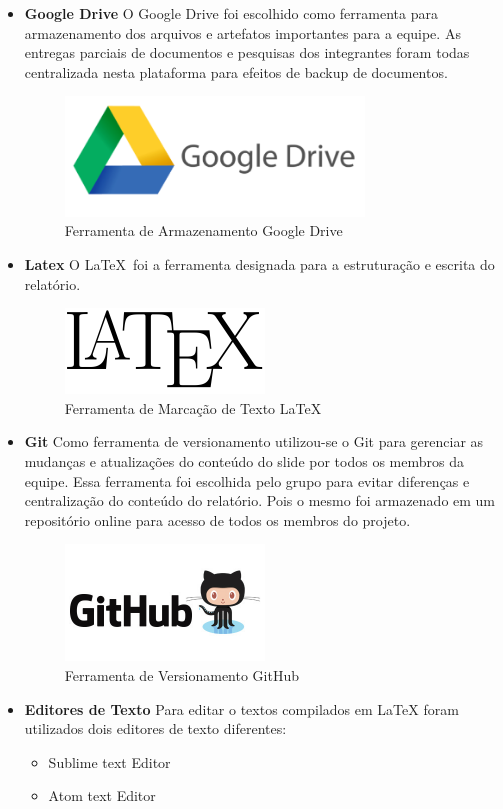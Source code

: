 \begin{itemize}
\item \textbf{Google Drive}
O Google Drive foi escolhido como ferramenta para armazenamento dos arquivos e artefatos importantes para a
equipe. As entregas parciais de documentos e pesquisas dos integrantes foram todas centralizada nesta plataforma
para efeitos de backup de documentos.
\begin{figure}[h]
  \centering
  \includegraphics[width=300px, scale=0.5]{figuras/google_drive-logo}
  \caption{Ferramenta de Armazenamento Google Drive}
  \label{table:google_drive-logo}
\end{figure}
\item \textbf{Latex}
O \LaTeX\ foi a ferramenta designada para a estruturação e escrita do relatório.
\begin{figure}[h]
  \centering
  \includegraphics[width=200px, scale=0.5]{figuras/latex_logo}
  \caption{Ferramenta de Marcação de Texto LaTeX}
  \label{table:latex_logo}
\end{figure}
\item \textbf{Git}
Como ferramenta de versionamento utilizou-se o Git para gerenciar as mudanças e atualizações do conteúdo do slide
por todos os membros da equipe. Essa ferramenta foi escolhida pelo grupo para evitar diferenças e centralização do
conteúdo do relatório. Pois o mesmo foi armazenado em um repositório online para acesso de todos os membros do projeto.
\begin{figure}[h]
  \centering
  \includegraphics[width=200px, scale=0.5]{figuras/git}
  \caption{Ferramenta de Versionamento GitHub}
  \label{table:git}
\end{figure}
\item \textbf{Editores de Texto}
\label{sub:Editores de Texto}
Para editar o textos compilados em LaTeX foram utilizados dois editores de texto diferentes:
\begin{itemize}
  \item Sublime text Editor
  \item Atom text Editor
\end{itemize}


\end{itemize}
